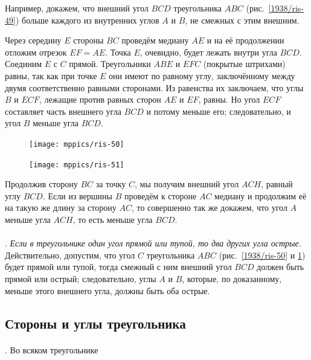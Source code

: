 \documentclass[oneside]{book}
\begin{document}
Например, докажем, что внешний угол $BCD$ треугольника $ABC$
(рис.~\ref{1938/ris-49}) больше каждого из внутренних углов $A$ и $B$, не смежных с этим внешним.

Через середину $E$ стороны $BC$ проведём медиану $AE$ и на её продолжении отложим отрезок $EF=AE$.
Точка $E$, очевидно, будет лежать внутри угла $BCD$.
Соединим $E$ с $C$ прямой.
Треугольники $ABE$ и $EFC$ (покрытые штрихами) равны, так как при точке $E$ они имеют по равному углу, заключённому между двумя соответственно равными сторонами.
Из равенства их заключаем, что углы $B$ и $ECF$, лежащие против равных сторон $AE$ и $EF$, равны.
Но угол $ECF$ составляет часть внешнего угла $BCD$ и потому меньше его;
следовательно, и угол $B$ меньше угла $BCD$.

{

\begin{figure}
\centering
\texttt{[image: mppics/ris-50]}
\caption{}\label{1938/ris-50}
\centering
\texttt{[image: mppics/ris-51]}
\caption{}\label{1938/ris-51}
\end{figure}

Продолжив сторону $BC$ за точку $C$, мы получим внешний угол $ACH$, равный углу $BCD$.
Если из вершины $B$ проведём к стороне $AC$ медиану и продолжим её на такую же длину за сторону $AC$, то совершенно так же докажем, что угол $A$ меньше угла $ACH$, то есть меньше угла $BCD$.

\paragraph{}\label{1938/45}
\mbox{.}
\emph{Если в треугольнике один угол прямой или тупой, то два других угла острые.}
Действительно, допустим, что угол $C$ треугольника $ABC$ 
(рис.~\ref{1938/ris-50} и \ref{1938/ris-51}) будет прямой или тупой, тогда смежный с ним внешний угол $BCD$ должен быть прямой или острый;
следовательно, углы $A$ и $B$, которые, по доказанному, меньше этого внешнего угла, должны быть оба острые.

}

\subsection*{Стороны и углы треугольника}

\paragraph{}\label{1938/46}
.
Во всяком треугольнике
\end{document}
